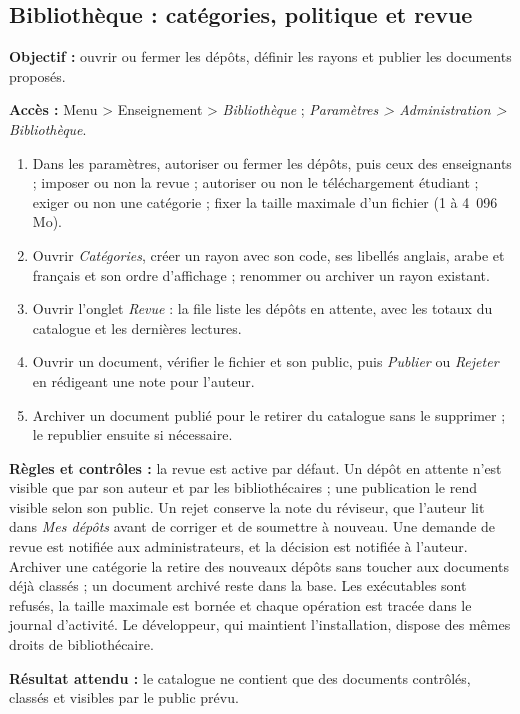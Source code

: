 \subsection{Bibliothèque : catégories, politique et revue}
\textbf{Objectif :} ouvrir ou fermer les dépôts, définir les rayons et publier les documents proposés.\par
\textbf{Accès :} Menu > Enseignement > \emph{Bibliothèque} ; \emph{Paramètres > Administration >
Bibliothèque}.\par
\begin{enumerate}
    \item Dans les paramètres, autoriser ou fermer les dépôts, puis ceux des enseignants ; imposer ou
          non la revue ; autoriser ou non le téléchargement étudiant ; exiger ou non une catégorie ;
          fixer la taille maximale d'un fichier (1 à 4~096 Mo).
    \item Ouvrir \emph{Catégories}, créer un rayon avec son code, ses libellés anglais, arabe et
          français et son ordre d'affichage ; renommer ou archiver un rayon existant.
    \item Ouvrir l'onglet \emph{Revue} : la file liste les dépôts en attente, avec les totaux du
          catalogue et les dernières lectures.
    \item Ouvrir un document, vérifier le fichier et son public, puis \emph{Publier} ou \emph{Rejeter}
          en rédigeant une note pour l'auteur.
    \item Archiver un document publié pour le retirer du catalogue sans le supprimer ; le republier
          ensuite si nécessaire.
\end{enumerate}
\textbf{Règles et contrôles :} la revue est active par défaut. Un dépôt en attente n'est visible que par
son auteur et par les bibliothécaires ; une publication le rend visible selon son public. Un rejet
conserve la note du réviseur, que l'auteur lit dans \emph{Mes dépôts} avant de corriger et de soumettre
à nouveau. Une demande de revue est notifiée aux administrateurs, et la décision est notifiée à
l'auteur. Archiver une catégorie la retire des nouveaux dépôts sans toucher aux documents déjà classés ;
un document archivé reste dans la base. Les exécutables sont refusés, la taille maximale est bornée et
chaque opération est tracée dans le journal d'activité. Le développeur, qui maintient l'installation,
dispose des mêmes droits de bibliothécaire.\par
\textbf{Résultat attendu :} le catalogue ne contient que des documents contrôlés, classés et visibles
par le public prévu.

